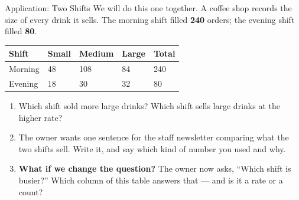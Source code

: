\boxguard[14]
\begin{notesbox}{Application: Two Shifts}
We will do this one together. A coffee shop records the size of every drink it sells. The
morning shift filled \textbf{240} orders; the evening shift filled \textbf{80}.

\vspace{4pt}
\small
\renewcommand{\arraystretch}{1.2}
\begin{tabularx}{\linewidth}{@{} l Y Y Y Y @{}}
\textbf{Shift} & \textbf{Small} & \textbf{Medium} & \textbf{Large} & \textbf{Total} \\
\hline
Morning &  48 & 108 & 84 & 240 \\
Evening &  18 &  30 & 32 &  80 \\
\hline
\end{tabularx}

\normalsize
\begin{enumerate}[label=\textbf{\alph*.}, leftmargin=1.8em, itemsep=6pt]
  \item Which shift sold more large drinks?  \quad
        Which shift sells large drinks at the higher rate? 
  \item The owner wants one sentence for the staff newsletter comparing what the two shifts
        sell. Write it, and say which kind of number you used and why.
  \item \textbf{What if we change the question?} The owner now asks, ``Which shift is busier?''
        Which column of this table answers that --- and is it a rate or a count?
\end{enumerate}
\end{notesbox}


